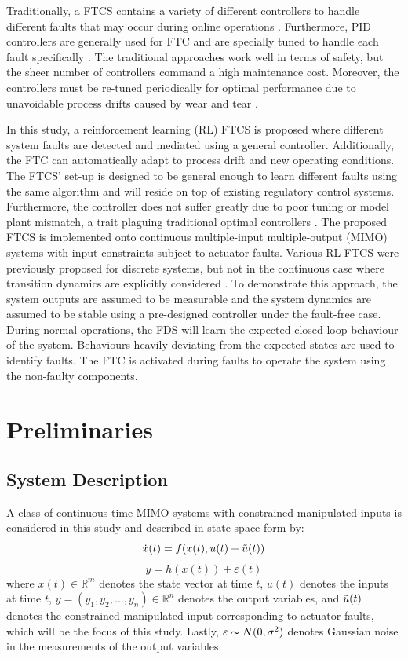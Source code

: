 Traditionally, a FTCS contains a variety of different controllers to handle different faults that may occur during online operations \cite{ftc_book_ref1}. Furthermore, PID controllers are generally used for FTC and are specially tuned to handle each fault specifically \cite{process_faults}. The traditional approaches work well in terms of safety, but the sheer number of controllers command a  high maintenance cost.  Moreover, the controllers must be re-tuned periodically for optimal performance due to unavoidable process drifts caused by wear and tear \cite{process_control_ref13}.

In this study, a reinforcement learning (RL) FTCS is proposed where different system faults are detected and mediated using a general controller. Additionally, the FTC can automatically adapt to process drift and new operating conditions. The FTCS' set-up is designed to be general enough to learn different faults using the same algorithm and will reside on top of existing regulatory control systems.  Furthermore, the controller does not suffer greatly due to poor tuning or model plant mismatch, a trait plaguing traditional optimal controllers \cite{model_plant_mismatch}.  The proposed FTCS is implemented onto continuous multiple-input multiple-output (MIMO) systems with input constraints subject to actuator faults. Various RL FTCS were previously proposed for discrete systems, but not in the continuous case where transition dynamics are explicitly considered \cite{ftc_ex2_ref5, ftc_ex1_ref6}. To demonstrate this approach, the system outputs are assumed to be measurable and the system dynamics are assumed to be stable using a pre-designed controller under the fault-free case.  During normal operations, the FDS will learn the expected closed-loop behaviour of the system.  Behaviours heavily deviating from the expected states are used to identify faults. The FTC is activated during faults to operate the system using the non-faulty components.

\section{Preliminaries}
\subsection{System Description}
A class of continuous-time MIMO systems with constrained manipulated inputs is considered in this study and described in state space form by:
\begin{equation}
\dot{x}(t) = f(x(t), u(t) + \Tilde{u}(t))
\label{eq:system_states}
\end{equation}
\begin{equation}
y = h(x(t)) + \varepsilon(t)
\label{eq:system_output}
\end{equation}
where $x(t) \in {\mathbb{R}}^m$ denotes the state vector at time $t$, $u(t)$ denotes the inputs at time $t$, $y = (y_{1}, y_{2}, ..., y_{n}) \in {\mathbb{R}}^n$ denotes the output variables, and $\Tilde{u}(t)$ denotes the constrained manipulated input corresponding to actuator faults, which will be the focus of this study. Lastly, $\varepsilon \thicksim N(0, \sigma^2)$ denotes Gaussian noise in the measurements of the output variables.

